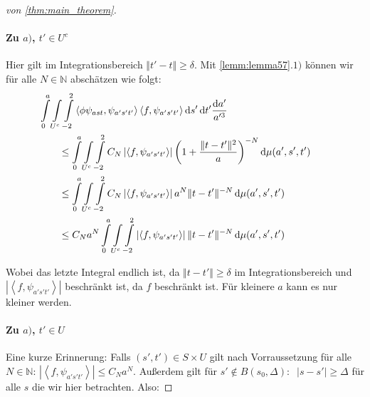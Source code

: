 \begin{proof}[von \ref{thm:main_theorem}]
\paragraph*{Zu $a)$, $t' \in U^c$}
Hier gilt im Integrationsbereich $\Vert t' - t \Vert \geq \delta$. Mit \cref{lemm:lemma57}$.1)$ können wir für alle $N\in \mathbb{N}$ abschätzen wie folgt:
\begin{align*}
 &\kern-2em
 \int\limits_{0}^{a} \int\limits_{U^c} \int\limits_{-2}^2
 \left\langle \phi \psi_{ast}, \psi_{a's't'} \right\rangle
 \left\langle f, \psi_{a's't'} \right\rangle
    \d s' \d t' \frac{\d a'}{a^{\prime 3}}
\\&\leq
\int\limits_{0}^{a} \int\limits_{U^c} \int\limits_{-2}^2
C_N
\left| \left\langle f, \psi_{a's't'} \right\rangle \right|
\left(1+\frac{\Vert t-t' \Vert^2}{a}\right)^{-N} \d \mu(a',s',t')
\\&\leq
\int\limits_{0}^{a} \int\limits_{U^c} \int\limits_{-2}^2
C_N
\left| \left\langle f, \psi_{a's't'} \right\rangle \right|
a^N \Vert t-t' \Vert^{-N} \d \mu(a',s',t')
\\&\leq
C_N a^N
\int\limits_{0}^{a} \int\limits_{U^c} \int\limits_{-2}^2
\left| \left\langle f, \psi_{a's't'} \right\rangle \right|
\Vert t-t' \Vert^{-N} \d \mu(a',s',t')
\end{align*}

Wobei das letzte Integral endlich ist, da $\Vert t-t'\Vert \geq \delta$ im Integrationsbereich und $\left| \left\langle f, \psi_{a's't'} \right\rangle \right|$ beschränkt ist, da $f$ beschränkt ist. Für kleinere $a$ kann es nur kleiner werden.


\paragraph*{Zu $a)$, $t' \in U$}
Eine kurze Erinnerung: Falls $(s',t') \in S \times U$ gilt nach Vorraussetzung für alle $N \in \mathbb{N}$:
$\left| \left\langle f, \psi_{a's't'} \right\rangle \right| \leq C_N a^N$.
Außerdem gilt für $s' \notin B(s_0,\Delta) : ~$ $|s-s'|  \geq \Delta$ für alle $s$ die wir hier betrachten. Also:


\end{proof}
